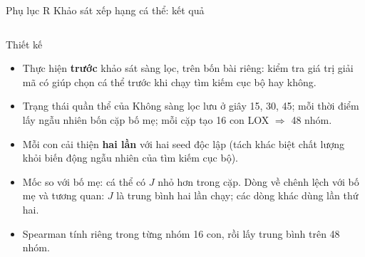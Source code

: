 \documentclass[aspectratio=169,10pt,t,xcolor={table}]{beamer}
\newcommand{\mth}[1]{\textsf{#1}}
\newcommand{\unscreened}{\mth{Không sàng lọc}}
\newcommand{\apptitle}[2]{Phụ lục #1 \textperiodcentered{} #2}
\begin{document}
\begin{frame}[label=appR]{\apptitle{R}{Khảo sát xếp hạng cá thể: kết quả}}
\begin{columns}[T,onlytextwidth]
\begin{block}{Thiết kế}
\scriptsize
\begin{itemize}
\item Thực hiện \textbf{trước} khảo sát sàng lọc, trên bốn bài riêng: kiểm tra giá trị giải mã có giúp chọn cá thể trước khi chạy tìm kiếm cục bộ hay không.
\item Trạng thái quần thể của \unscreened{} lưu ở giây 15, 30, 45; mỗi thời điểm lấy ngẫu nhiên bốn cặp bố mẹ; mỗi cặp tạo 16 con LOX $\Rightarrow$ 48 nhóm.
\item Mỗi con cải thiện \textbf{hai lần} với hai seed độc lập (tách khác biệt chất lượng khỏi biến động ngẫu nhiên của tìm kiếm cục bộ).
\item Mốc so với bố mẹ: cá thể có $J$ nhỏ hơn trong cặp. Dòng về chênh lệch với bố mẹ và tương quan: $J$ là trung bình hai lần chạy; các dòng khác dùng lần thứ hai.
\item Spearman tính riêng trong từng nhóm 16 con, rồi lấy trung bình trên 48 nhóm.
\end{itemize}
\end{block}
\end{columns}
\end{frame}
\end{document}
